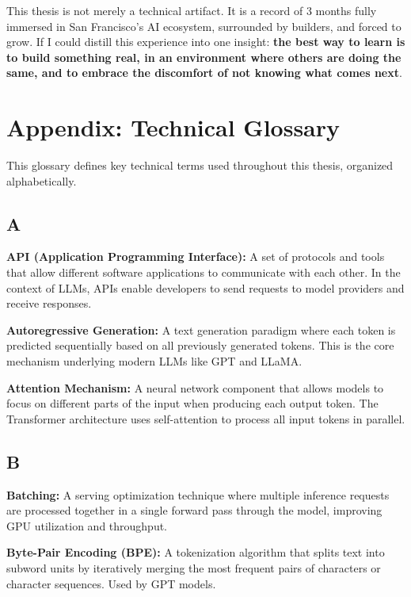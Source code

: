 \documentclass[english]{article}
\begin{document}
This thesis is not merely a technical artifact. It is a record of 3 months fully immersed in San Francisco's AI ecosystem, surrounded by builders, and forced to grow. If I could distill this experience into one insight: \textbf{the best way to learn is to build something real, in an environment where others are doing the same, and to embrace the discomfort of not knowing what comes next}.


\newpage
\section*{Appendix: Technical Glossary}

This glossary defines key technical terms used throughout this thesis, organized alphabetically.

\subsection*{A}

\textbf{API (Application Programming Interface):} A set of protocols and tools that allow different software applications to communicate with each other. In the context of LLMs, APIs enable developers to send requests to model providers and receive responses.

\textbf{Autoregressive Generation:} A text generation paradigm where each token is predicted sequentially based on all previously generated tokens. This is the core mechanism underlying modern LLMs like GPT and LLaMA.

\textbf{Attention Mechanism:} A neural network component that allows models to focus on different parts of the input when producing each output token. The Transformer architecture uses self-attention to process all input tokens in parallel.

\subsection*{B}

\textbf{Batching:} A serving optimization technique where multiple inference requests are processed together in a single forward pass through the model, improving GPU utilization and throughput.

\textbf{Byte-Pair Encoding (BPE):} A tokenization algorithm that splits text into subword units by iteratively merging the most frequent pairs of characters or character sequences. Used by GPT models.
\end{document}
